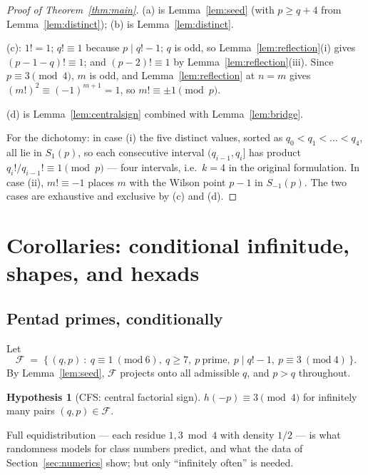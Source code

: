 \documentclass[11pt]{article}
\theoremstyle{definition}
\newtheorem{hypothesis}[theorem]{Hypothesis}
\theoremstyle{remark}
\begin{document}
\begin{proof}[Proof of Theorem~\ref{thm:main}]
(a) is Lemma~\ref{lem:seed} (with $p \ge q+4$ from
Lemma~\ref{lem:distinct}); (b) is Lemma~\ref{lem:distinct}.

(c): $1! = 1$; $q! \equiv 1$ because $p \mid q! - 1$; $q$ is odd, so
Lemma~\ref{lem:reflection}(i) gives $(p-1-q)! \equiv 1$; and
$(p-2)! \equiv 1$ by Lemma~\ref{lem:reflection}(iii). Since
$p \equiv 3 \pmod 4$, $m$ is odd, and Lemma~\ref{lem:reflection} at $n = m$
gives $(m!)^2 \equiv (-1)^{m+1} = 1$, so $m! \equiv \pm 1 \pmod p$.

(d) is Lemma~\ref{lem:centralsign} combined with Lemma~\ref{lem:bridge}.

For the dichotomy: in case (i) the five distinct values, sorted as
$q_0 < q_1 < \dots < q_4$, all lie in $S_1(p)$, so each consecutive interval
$(q_{i-1}, q_i]$ has product $q_i!/q_{i-1}! \equiv 1 \pmod p$ --- four
intervals, i.e.\ $k = 4$ in the original formulation. In case (ii),
$m! \equiv -1$ places $m$ with the Wilson point $p-1$ in $S_{-1}(p)$. The two
cases are exhaustive and exclusive by (c) and (d).
\end{proof}

\section{Corollaries: conditional infinitude, shapes, and hexads}
\label{sec:corollaries}

\subsection{Pentad primes, conditionally}

Let
\[
  \mathcal F \;=\; \bigl\{\, (q, p) \ :\ q \equiv 1 \ (\mathrm{mod}\ 6),\
  q \ge 7,\ p \ \text{prime},\ p \mid q! - 1,\ p \equiv 3 \ (\mathrm{mod}\
  4) \,\bigr\}.
\]
By Lemma~\ref{lem:seed}, $\mathcal F$ projects onto all admissible $q$, and
$p > q$ throughout.

\begin{hypothesis}[CFS: central factorial sign]\label{hyp:cfs}
$h(-p) \equiv 3 \pmod 4$ for infinitely many pairs $(q, p) \in \mathcal F$.
\end{hypothesis}

Full equidistribution --- each residue $1, 3 \bmod 4$ with density $1/2$ ---
is what randomness models for class numbers predict, and what the data of
Section~\ref{sec:numerics} show; but only ``infinitely often'' is needed.
\end{document}
